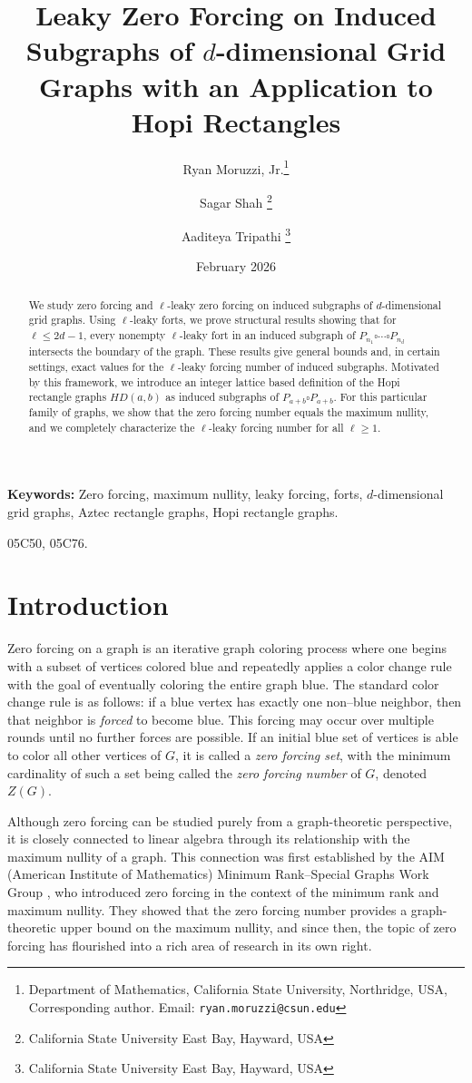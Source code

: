 \documentclass[11pt]{article}
\title{Leaky Zero Forcing on Induced Subgraphs of $d$-dimensional Grid Graphs with an Application to Hopi Rectangles}
\author{
Ryan Moruzzi, Jr.\thanks{Department of Mathematics, California State University, Northridge, USA, \\ Corresponding author. Email: \texttt{ryan.moruzzi@csun.edu}} \and Sagar Shah \thanks{California State University East Bay, Hayward, USA} \and Aaditeya Tripathi \thanks{California State University East Bay, Hayward, USA} 
}
\date{February 2026}
\theoremstyle{plain} \newtheorem{question}{Question}
\theoremstyle{definition}
\begin{document}
\maketitle

\begin{abstract}
We study zero forcing and $\ell$-leaky zero forcing on induced subgraphs of $d$-dimensional grid graphs. Using $\ell$-leaky forts, we prove structural results showing that for $\ell \le 2d-1$, every nonempty $\ell$-leaky fort in an induced subgraph of $P_{n_1}\square\cdots\square P_{n_d}$ intersects the boundary of the graph. These results give general bounds and, in certain settings, exact values for the $\ell$-leaky forcing number of induced subgraphs. Motivated by this framework, we introduce an integer lattice based definition of the Hopi rectangle graphs $HD(a,b)$ as induced subgraphs of $P_{a+b}\square P_{a+b}$. For this particular family of graphs, we show that the zero forcing number equals the maximum nullity, and we completely characterize the $\ell$-leaky forcing number for all $\ell\ge 1$.

\end{abstract}

\noindent\textbf{Keywords:} Zero forcing, maximum nullity, leaky forcing, forts, $d$-dimensional grid graphs, Aztec rectangle graphs, Hopi rectangle graphs.

 05C50, 05C76.


\section{Introduction}
Zero forcing on a graph is an iterative graph coloring process where one begins with a subset of vertices colored blue and repeatedly applies a color change rule with the goal of eventually coloring the entire graph blue. The standard color change rule is as follows: if a blue vertex has exactly one non–blue neighbor, then that neighbor is \emph{forced} to become blue. This forcing may occur over multiple rounds until no further forces are possible. If an initial blue set of vertices is able to color all other vertices of $G$, it is called a \emph{zero forcing set}, with the minimum cardinality of such a set being called the \emph{zero forcing number} of $G$, denoted $Z(G)$.

Although zero forcing can be studied purely from a graph-theoretic perspective, it is closely connected to linear algebra through its relationship with the maximum nullity of a graph. This connection was first established by the AIM (American Institute of Mathematics) Minimum Rank–Special Graphs Work Group \cite{AIMMINIMUMRANKWorkgroup}, who introduced zero forcing in the context of the minimum rank and maximum nullity. They showed that the zero forcing number provides a graph-theoretic upper bound on the maximum nullity, and since then, the topic of zero forcing has flourished into a rich area of research in its own right. 
\end{document}
